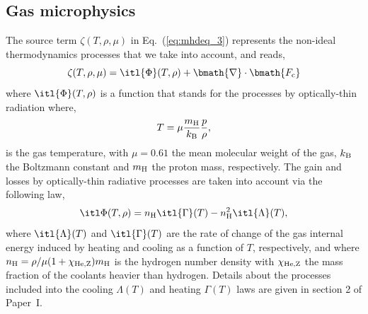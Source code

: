\documentclass[useAMS,usenatbib]{mn2e}
\begin{document}


\subsection{Gas microphysics}
\label{ssect:microphysics}


The source term $\zeta(T,\rho,\mu)$ in Eq.~(\ref{eq:mhdeq_3}) represents the non-ideal 
thermodynamics processes that we take into account, and reads, 
%
\begin{equation}
      \zeta(T,\rho,\mu) = \itl{\Phi}(T,\rho) + \bmath{\nabla} \cdot \bmath{{F}_{\rm c}}
\label{eq:terms}
\end{equation}
%
where $\itl{\Phi}(T,\rho)$ is a function that stands for the processes by 
optically-thin radiation where, 
%
\begin{equation}
	T =  \mu \frac{ m_{\mathrm{H}} }{ k_{\rm{B}} } \frac{p}{\rho},
\label{eq:temperature}
\end{equation}
%
is the gas temperature, with $\mu=0.61$ the mean molecular 
weight of the gas, $k_{\rm{B}}$ the Boltzmann constant 
and $m_{\rm H}$ the proton mass, respectively. The gain and losses by optically-thin 
radiative processes are taken into account via the following law,
%
\begin{equation}  
	 \itl \Phi(T,\rho)  =  n_{\mathrm{H}}\itl{\Gamma}(T)   
		   		 -  n^{2}_{\mathrm{H}}\itl{\Lambda}(T),
\label{eq:dissipation}
\end{equation}
%
where $\itl{\Lambda}(T)$ and $\itl{\Gamma}(T)$ are the rate of change of the gas 
internal energy induced by heating and cooling as a function of $T$, respectively, 
and where $n_{\mathrm{H}}=\rho/\mu (1+\chi_{\rm He,Z}) m_{\mathrm{H}}$ is the 
hydrogen number density with $\chi_{\rm He,Z}$ the mass fraction of the coolants heavier 
than hydrogen. Details about the processes included into the cooling $\Lambda(T)$ 
and heating $\Gamma(T)$ laws are given in section 2 of Paper~I.
\end{document}
